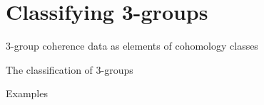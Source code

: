 \chapter{Classifying 3-groups}

\begin{prop} 3-group coherence data as elements of cohomology classes \end{prop}

\begin{thm} The classification of 3-groups \end{thm}

\begin{example} Examples \end{example}